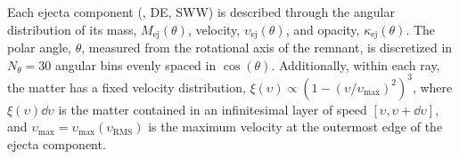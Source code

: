 Each ejecta component (\eg, \ac{DE}, \ac{SWW}) is described through 
the angular distribution of its mass, $M_{\text{ej}}(\theta)$, 
velocity, $\upsilon_{\text{ej}}(\theta)$, and opacity, $\kappa_{\text{ej}}(\theta)$.
%
The polar angle, $\theta$, measured from the rotational axis of the \pmerg{} remnant, is discretized in 
$N_\theta=30$ angular bins evenly spaced in $\cos{(\theta)}$.
%
Additionally, within each ray, the matter has a fixed velocity distribution, 
$\xi(\upsilon) \propto (1 - (\upsilon / \upsilon_{\text{max}})^2)^3$,
%
%
where $\xi(\upsilon) \dd \upsilon$ is the matter contained in an infinitesimal layer of speed 
$\left[\upsilon,\upsilon+\dd \upsilon\right]$, and 
$\upsilon_{\text{max}}=\upsilon_{\text{max}}(\upsilon_{\text{RMS}})$ 
is the maximum velocity at the outermost edge of the ejecta component.
%


